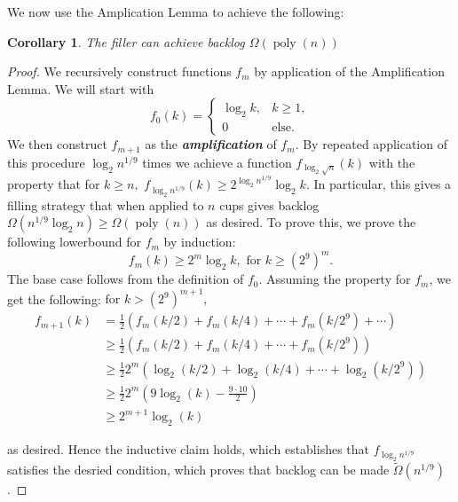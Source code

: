 \documentclass[twocolumn]{article}[11pt]
\newcommand{\defn}[1]{{\textit{\textbf{\boldmath #1}}}}
\DeclareMathOperator{\poly}{\text{poly}}
\newtheorem{corollary}{Corollary}
\begin{document}
We now use the Amplication Lemma to achieve the following:
\begin{corollary}
  \label{cor:poly}
  The filler can achieve backlog $\Omega(\poly(n))$
\end{corollary}
\begin{proof}
  We recursively construct functions $f_m$ by application of the Amplification
  Lemma. We will start with 
  $$f_0(k) = 
  \begin{cases} 
    \log_2 k, & k\geq 1, \\
    0 & \text{else.}
  \end{cases}$$
    We then construct $f_{m+1}$ as the
  \defn{amplification} of $f_m$.  
  By repeated application of this procedure $\log_2 n^{1/9}$ times we 
  achieve a function $f_{\log_2 \sqrt{n}}(k)$ with the property that for $k \geq n,$
  $f_{\log_2 n^{1/9}}(k) \geq 2^{\log_2 n^{1/9}} \log_2 k$. In particular, this gives a filling strategy 
  that when applied to $n$ cups gives backlog $\Omega(n^{1/9}\log_2 n) \ge \Omega(\poly(n))$ as desired.
  To prove this, we prove the following lowerbound for $f_m$ by induction:
  $$f_m(k) \geq 2^m \log_2 k, \text{ for } k \geq (2^9)^m.$$
  The base case follows from the definition of $f_0$. Assuming the property for $f_m$, we get the following:
  $ \text{for } k > (2^9)^{m+1},$
  \begin{align}
    f_{m+1}(k) &= \frac{1}{2}(f_m(k/2) + f_m(k/4) + \cdots + f_m(k/2^9) + \cdots)\\
  &\geq \frac{1}{2}(f_m(k/2) + f_m(k/4) + \cdots + f_m(k/2^9))\\
  &\geq \frac{1}{2}2^m(\log_2 (k/2) + \log_2(k/4) + \cdots + \log_2(k/2^9))\\
  &\geq \frac{1}{2}2^m(9\log_2 (k) - \frac{9 \cdot 10}{2}) \label{step:readydrop}\\
  &\geq 2^{m+1} \log_2(k) \label{step:dropped}
  \end{align}

  as desired. Hence the inductive claim holds, which establishes that $f_{\log_2
  n^{1/9}}$ satisfies the desried condition, which proves that backlog can be
  made $\tilde{\Omega}(n^{1/9})$.


\end{proof}
\end{document}
